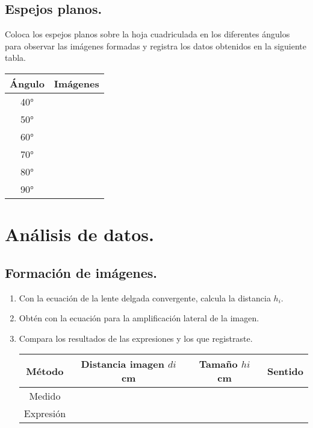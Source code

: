 \documentclass[14pt]{extarticle}
\begin{document}
\subsection{Espejos planos.}

Coloca los espejos planos sobre la hoja cuadriculada en los diferentes ángulos para observar las imágenes formadas y registra los datos obtenidos en la siguiente tabla.
\begin{table}[H]
    \centering
    \begin{tabular}{| c | c |} \hline
    Ángulo & Imágenes \\ \hline
    \ang{40} & \\ \hline
    \ang{50} & \\ \hline
    \ang{60} & \\ \hline
    \ang{70} & \\ \hline
    \ang{80} & \\ \hline
    \ang{90} & \\ \hline
    \end{tabular}
\end{table}

\section{Análisis de datos.}

\subsection{Formación de imágenes.}

\begin{enumerate}
\item Con la ecuación de la lente delgada convergente, calcula la distancia $h_{i}$.
\item Obtén con la ecuación para la amplificación lateral de la imagen.
\item Compara los resultados de las expresiones y los que registraste.
\begin{table}[H]
    \centering
    \begin{tabular}{| c | c | c | c |} \hline
    Método & Distancia imagen $d{i}$ \unit{\centi\meter} & Tamaño $h{i}$ \unit{\centi\meter} & Sentido \\ \hline
    Medido & & & \\ \hline
    Expresión & & & \\ \hline
    \end{tabular}
\end{table}
\end{enumerate}
\end{document}
